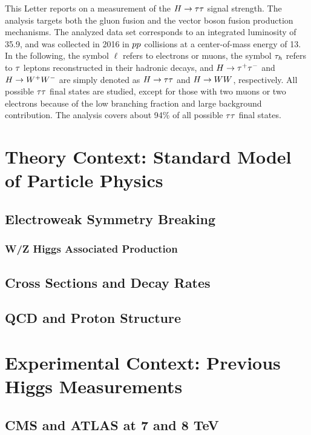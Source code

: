 This Letter reports on a measurement of the $H\to\tau\tau$ signal strength.
The analysis targets both the gluon fusion and the vector boson fusion production mechanisms.
The analyzed data set corresponds to an integrated luminosity of 35.9\fbinv, and was collected in 2016 in $pp$ collisions at a center-of-mass energy of
13\TeV.
In the following, the symbol $\ell$ refers to electrons or muons,
the symbol $\tau_{h}$ refers to $\tau$ leptons reconstructed in their hadronic decays, and
$H\to\tau^+\tau^-$  and $H\to W^+W^-$ are simply denoted as $H\to\tau\tau$  and $H\to WW$, respectively.
All possible $\tau\tau$ final states are studied, except for those with two muons or two electrons because of the low branching fraction and large background contribution. The analysis covers about 94\% of all possible $\tau\tau$ final states.

\section{Theory Context: Standard Model of Particle Physics}

\subsection{Electroweak Symmetry Breaking}

\subsubsection{W/Z Higgs Associated Production}

\subsection{Cross Sections and Decay Rates}

\subsection{QCD and Proton Structure}

\section{Experimental Context: Previous Higgs Measurements}


\subsection{CMS and ATLAS at 7 and 8 TeV}





